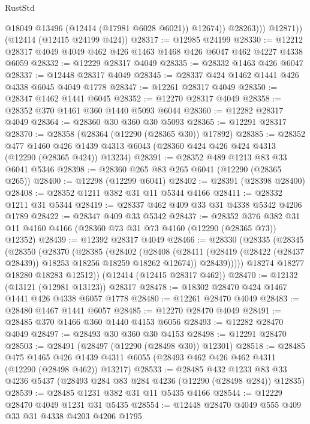 \begin{lexlean}{RustStd}
\begin{coremodule}
{\begin{coremodule}
{{{{{{{{{{{{{{{{{{{{{{{{{{{{{{{{{{{{{{{{{{{{{{{{{{                  @18049
                  @13496
                  (@12414 (@17981 @6028 @6021))
                  @12674))
              @28263)))
        @12871))
    (@12414 (@12415 @24199 @424))
@28317 := @12985 @24199
@28330 := @12212 @28317 @4049 @4049 @462 @426 @1463 @1468 @426 @6047 @462 @4227 @4338 @6059
@28332 := @12229 @28317 @4049
@28335 := @28332 @1463 @426 @6047
@28337 := @12448 @28317 @4049
@28345 := @28337 @424 @1462 @1441 @426 @4338 @6045 @4049 @1778
@28347 := @12261 @28317 @4049
@28350 := @28347 @1462 @1441 @6045
@28352 := @12270 @28317 @4049
@28358 := @28352 @370 @1461 @360 @1440 @5093 @6044
@28360 := @12282 @28317 @4049
@28364 := @28360 @30 @360 @30 @5093
@28365 := @12291 @28317
@28370 := @28358 (@28364 (@12290 (@28365 @30)) @17892)
@28385 := @28352
    @477
    @1460
    @426
    @1439
    @4313
    @6043
    (@28360 @424 @426 @424 @4313 (@12290 (@28365 @424)) @13234)
@28391 := @28352 @489 @1213 @83 @33 @6041 @5346
@28398 := @28360 @265 @83 @265 @6041 (@12290 (@28365 @265))
@28400 := @12298 (@12299 @6041)
@28402 := @28391 (@28398 @28400)
@28408 := @28352 @1211 @382 @31 @11 @5344 @4166
@28411 := @28332 @1211 @31 @5344
@28419 := @28337 @462 @409 @33 @31 @4338 @5342 @4206 @1789
@28422 := @28347 @409 @33 @5342
@28437 := @28352
    @376
    @382
    @31
    @11
    @4160
    @4166
    (@28360 @73 @31 @73 @4160 (@12290 (@28365 @73)) @12352)
@28439 := @12392 @28317 @4049
@28466 := @28330
    (@28335
      (@28345
        (@28350
          (@28370
            (@28385
              (@28402
                (@28408
                  (@28411 (@28419 (@28422 (@28437 @28439)) @18253 @18256 @18259 @18262 @12674))
                  @28439)))))
        @18274
        @18277
        @18280
        @18283
        @12512))
    (@12414 (@12415 @28317 @462))
@28470 := @12132 (@13121 (@12981 @13123)) @28317
@28478 := @18302 @28470 @424 @1467 @1441 @426 @4338 @6057 @1778
@28480 := @12261 @28470 @4049
@28483 := @28480 @1467 @1441 @6057
@28485 := @12270 @28470 @4049
@28491 := @28485 @370 @1466 @360 @1440 @4153 @6056
@28493 := @12282 @28470 @4049
@28497 := @28493 @30 @360 @30 @4153
@28498 := @12291 @28470
@28503 := @28491 (@28497 (@12290 (@28498 @30)) @12301)
@28518 := @28485
    @475
    @1465
    @426
    @1439
    @4311
    @6055
    (@28493 @462 @426 @462 @4311 (@12290 (@28498 @462)) @13217)
@28533 := @28485
    @432
    @1233
    @83
    @33
    @4236
    @5437
    (@28493 @284 @83 @284 @4236 (@12290 (@28498 @284)) @12835)
@28539 := @28485 @1231 @382 @31 @11 @5435 @4166
@28544 := @12229 @28470 @4049 @1231 @31 @5435
@28554 := @12448 @28470 @4049 @555 @409 @33 @31 @4338 @4203 @4206 @1795
}}}}}}}}}}}}}}}}}}}}}}}}}}}}}}}}}}}}}}}}}}}}}}}}}}
\end{coremodule}}
\end{coremodule}
\end{lexlean}
